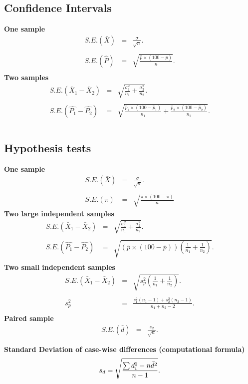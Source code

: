 \documentclass[a4paper,12pt]{article}
\begin{document}
\subsection*{Confidence Intervals}
{\bf One sample}
\begin{eqnarray*} S.E.(\bar{X})&=&\frac{\sigma}{\sqrt{n}}.\\\\
S.E.(\hat{P})&=&\sqrt{\frac{\hat{p}\times(100-\hat{p})}{n}}.\\
\end{eqnarray*}
{\bf Two samples}
\begin{eqnarray*}
S.E.(\bar{X}_1-\bar{X}_2)&=&\sqrt{\frac{\sigma^2_1}{n_1}+\frac{\sigma_2^2}{n_2}}.\\\\
S.E.(\hat{P_1}-\hat{P_2})&=&\sqrt{\frac{\hat{p}_1\times(100-\hat{p}_1)}{n_1}+\frac{\hat{p}_2\times(100-\hat{p}_2)}{n_2}}.\\\\
\end{eqnarray*}
\subsection*{Hypothesis tests}
{\bf One sample}
\begin{eqnarray*}
S.E.(\bar{X})&=&\frac{\sigma}{\sqrt{n}}.\\\\
S.E.(\pi)&=&\sqrt{\frac{\pi\times(100-\pi)}{n}}
\end{eqnarray*}
{\bf Two large independent samples}
\begin{eqnarray*}
S.E.(\bar{X}_1-\bar{X}_2)&=&\sqrt{\frac{\sigma^2_1}{n_1}+\frac{\sigma_2^2}{n_2}}.\\\\
S.E.(\hat{P_1}-\hat{P_2})&=&\sqrt{\left(\bar{p}\times(100-\bar{p})\right)\left(\frac{1}{n_1}+\frac{1}{n_2}\right)}.\\
\end{eqnarray*}
{\bf Two small independent samples}
\begin{eqnarray*}
S.E.(\bar{X}_1-\bar{X}_2)&=&\sqrt{s_p^2\left(\frac{1}{n_1}+\frac{1}{n_2}\right)}.\\\\
s_p^2&=&\frac{s_1^2(n_1-1)+s_2^2(n_2-1)}{n_1+n_2-2}.\\
\end{eqnarray*}
{\bf Paired sample}
\begin{eqnarray*}
S.E.(\bar{d})&=&\frac{s_d}{\sqrt{n}}.\\\\
\end{eqnarray*}
{\bf Standard Deviation of case-wise differences (computational formula)}
\begin{eqnarray*}
s_d = \sqrt{ {\sum d_i^2 - n\bar{d}^2 \over n-1}}.\\\\
\end{eqnarray*}
\end{document}
